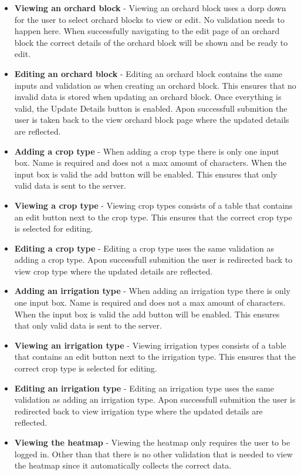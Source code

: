 \documentclass[11pt,fleqn]{book} %
\begin{document}
\begin{itemize}
				\item\textbf{Viewing an orchard block} -
				Viewing an orchard block uses a dorp down for the user to select orchard blocks to view or edit. No validation needs to happen here. When successfully navigating to the edit page of an orchard block the correct details of the orchard block will be shown and be ready to edit.
				
				\item\textbf{Editing an orchard block} -
				Editing an orchard block contains the same inputs and validation as when creating an orchard block. This ensures that no invalid data is stored when updating an orchard block. Once everything is valid, the Update Details button is enabled. Apon successfull submition the user is taken back to the view orchard block page where the updated details are reflected.							
				
				\item \textbf{Adding a crop type} -
				When adding a crop type there is only one input box. Name is required and does not a max amount of characters. When the input box is valid the add button will be enabled. This ensures that only valid data is sent to the server.
				
				\item \textbf{Viewing a crop type} -
				Viewing crop types consists of a table that contains an edit button next to the crop type. This ensures that the correct crop type is selected for editing.
				
				\item \textbf{Editing a crop type} -
				Editing a crop type uses the same validation as adding a crop type. Apon successfull submition the user is redirected back to view crop type where the updated details are reflected.
				
				\item \textbf{Adding an irrigation type} -
				When adding an irrigation type there is only one input box. Name is required and does not a max amount of characters. When the input box is valid the add button will be enabled. This ensures that only valid data is sent to the server.
				
				\item \textbf{Viewing an irrigation type} -
				Viewing irrigation types consists of a table that contains an edit button next to the irrigation type. This ensures that the correct crop type is selected for editing.
				
				\item \textbf{Editing an irrigation type} -
				Editing an irrigation type uses the same validation as adding an irrigation type. Apon successfull submition the user is redirected back to view irrigation type where the updated details are reflected.
				
				\item \textbf{Viewing the heatmap} -
				Viewing the heatmap only requires the user to be logged in. Other than that there is no other validation that is needed to view the heatmap since it automatically collects the correct data.
			\end{itemize}
\end{document}
